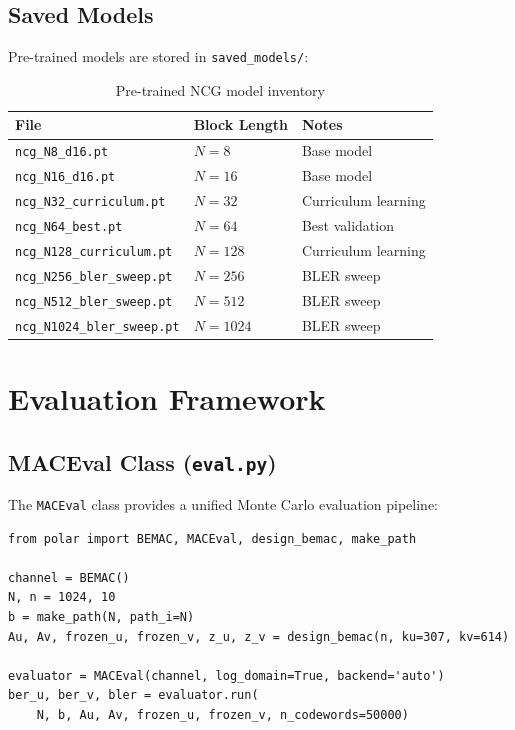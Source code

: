 \documentclass[11pt,a4paper]{article}
\begin{document}
\subsection{Saved Models}

Pre-trained models are stored in \texttt{saved\_models/}:
\begin{table}[h]
\centering
\caption{Pre-trained NCG model inventory}
\begin{tabular}{lll}
\toprule
\textbf{File} & \textbf{Block Length} & \textbf{Notes} \\
\midrule
\texttt{ncg\_N8\_d16.pt}  & $N = 8$ & Base model \\
\texttt{ncg\_N16\_d16.pt} & $N = 16$ & Base model \\
\texttt{ncg\_N32\_curriculum.pt} & $N = 32$ & Curriculum learning \\
\texttt{ncg\_N64\_best.pt} & $N = 64$ & Best validation \\
\texttt{ncg\_N128\_curriculum.pt} & $N = 128$ & Curriculum learning \\
\texttt{ncg\_N256\_bler\_sweep.pt} & $N = 256$ & BLER sweep \\
\texttt{ncg\_N512\_bler\_sweep.pt} & $N = 512$ & BLER sweep \\
\texttt{ncg\_N1024\_bler\_sweep.pt} & $N = 1024$ & BLER sweep \\
\bottomrule
\end{tabular}
\end{table}


\section{Evaluation Framework}
\label{sec:eval}

\subsection{MACEval Class (\texttt{eval.py})}

The \texttt{MACEval} class provides a unified Monte Carlo evaluation pipeline:

\begin{lstlisting}[caption={Basic MACEval usage}]
from polar import BEMAC, MACEval, design_bemac, make_path

channel = BEMAC()
N, n = 1024, 10
b = make_path(N, path_i=N)
Au, Av, frozen_u, frozen_v, z_u, z_v = design_bemac(n, ku=307, kv=614)

evaluator = MACEval(channel, log_domain=True, backend='auto')
ber_u, ber_v, bler = evaluator.run(
    N, b, Au, Av, frozen_u, frozen_v, n_codewords=50000)
\end{lstlisting}
\end{document}

